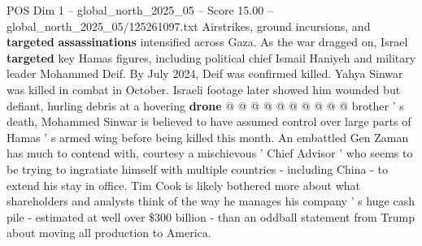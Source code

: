 \begin{textsample}{POS Dim 1 – global\_north\_2025\_05 – Score 15.00 – global\_north\_2025\_05/125261097.txt}
Airstrikes, ground incursions, and \textbf{targeted} \textbf{assassinations} intensified across Gaza.
As the war dragged on, Israel \textbf{targeted} key Hamas figures, including political chief Ismail Haniyeh and military leader Mohammed Deif.
By July 2024, Deif was confirmed killed.
Yahya Sinwar was killed in combat in October.
Israeli footage later showed him wounded but defiant, hurling debris at a hovering \textbf{drone} @ @ @ @ @ @ @ @ @ @ brother ' s death, Mohammed Sinwar is believed to have assumed control over large parts of Hamas ' s armed wing before being killed this month.
An embattled Gen Zaman has much to contend with, courtesy a mischievous ' Chief Advisor ' who seems to be trying to ingratiate himself with multiple countries - including China - to extend his stay in office.
Tim Cook is likely bothered more about what shareholders and analysts think of the way he manages his company ' s huge cash pile - estimated at well over \$300 billion - than an oddball statement from Trump about moving all production to America.

\end{textsample}
